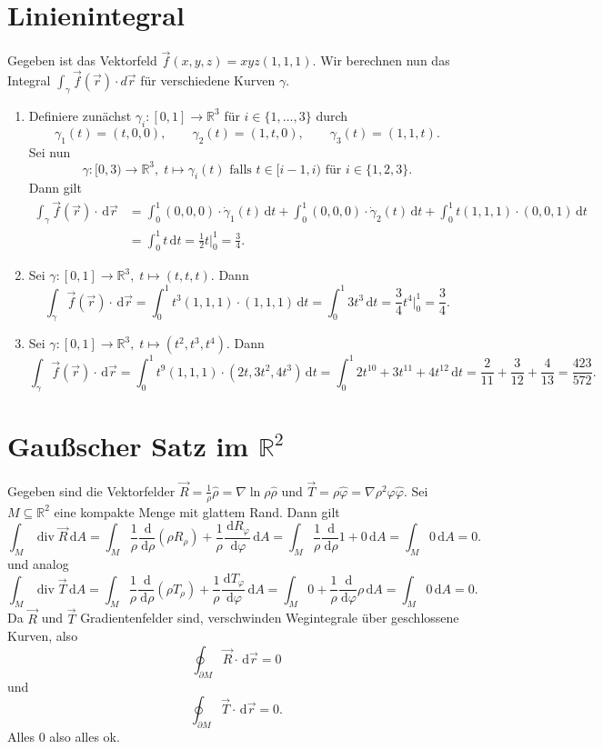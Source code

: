 \documentclass[11pt]{article}
\theoremstyle{plain}
\theoremstyle{definition}
\theoremstyle{remark}
\newcommand{\R}{\mathbb{R}}
\renewcommand{\d}{\,\mathrm{d}}
\newcommand{\ph}{\varphi}
\newcommand{\longto}{\longrightarrow}
\renewcommand{\div}{\operatorname{div}}
\begin{document}
\newpage
\section{Linienintegral}
Gegeben ist das Vektorfeld $\vec f(x,y,z) = xyz(1,1,1)$. Wir berechnen nun das Integral $\int_\gamma \vec f(\vec r) \cdot d\vec r$ für verschiedene Kurven $\gamma$.
\begin{enumerate}[label = \alph*)]
\item Definiere zunächst $\gamma_i : [0,1] \longto \R^3$ für $i \in \{1,\dots, 3\}$ durch
\[ \gamma_1(t) = (t,0,0), \qquad \gamma_2(t) = (1,t,0), \qquad \gamma_3(t) = (1,1,t). \]
Sei nun 
\[ \gamma : [0,3) \longto \R^3, \; t \longmapsto \gamma_i(t) \text{ falls } t \in [i-1, i) \text{ für } i \in \{1,2,3\}. \]
Dann gilt
\begin{align*}
\int_\gamma \vec f(\vec r) \cdot \d\vec r &= \int_0^1 (0,0,0) \cdot \dot\gamma_1(t) \d t + \int_0^1 (0,0,0) \cdot \dot\gamma_2(t) \d t + \int_0^1 t(1,1,1) \cdot (0,0,1) \d t \\
&= \int_0^1 t \d t = \frac{1}{2} t \Big\vert_0^1 = \frac{3}{4}.
\end{align*}

\item Sei $\gamma : [0,1] \longto \R^3, \; t \longmapsto (t,t,t)$. Dann
\[\int_\gamma \vec f(\vec r) \cdot \d\vec r = \int_0^1 t^3(1,1,1)\cdot (1,1,1) \d t = \int_0^1 3t^3 \d t = \frac{3}{4} t^4 \Big\vert_0^1 = \frac{3}{4}. \]

\item Sei $\gamma : [0,1] \longto \R^3, \; t \longmapsto (t^2, t^3, t^4)$. Dann
\[ \int_\gamma \vec f(\vec r) \cdot \d\vec r = \int_0^1 t^9(1,1,1)\cdot (2t, 3t^2, 4t^3) \d t = \int_0^1 2t^{10} + 3t^{11} + 4t^{12} \d t = \frac{2}{11} + \frac{3}{12} + \frac{4}{13} = \frac{423}{572}. \]
\end{enumerate}

\section{Gaußscher Satz im $\R^2$}
Gegeben sind die Vektorfelder $\vec R = \frac{1}{\rho} \hat \rho = \nabla\ln \rho \hat \rho$ und $\vec T = \rho \hat \ph = \nabla \rho^2 \ph\hat \ph$. Sei $M \subseteq \R^2$ eine kompakte Menge mit glattem Rand. Dann gilt
\[ \int_M \div \vec R \d A = \int_M \frac{1}{\rho} \frac{\d}{\d \rho}(\rho R_\rho) + \frac{1}{\rho} \frac{\d R_\ph}{\d \ph}\d A = \int_M \frac{1}{\rho} \frac{\d}{\d \rho} 1 + 0 \d A = \int_M 0 \d A = 0. \]
und analog
\[ \int_M \div \vec T \d A = \int_M \frac{1}{\rho} \frac{\d}{\d \rho}(\rho T_\rho) + \frac{1}{\rho} \frac{\d T_\ph}{\d \ph}\d A = \int_M 0 + \frac{1}{\rho} \frac{\d }{\d \ph} \rho \d A = \int_M 0 \d A = 0. \]
Da $\vec R$ und $\vec T$ Gradientenfelder sind, verschwinden Wegintegrale über geschlossene Kurven, also
\[ \oint_{\partial M} \vec R \cdot \d\vec r = 0\]
und
\[ \oint_{\partial M} \vec T \cdot \d\vec r = 0.\]
Alles 0 also alles ok.
\end{document}
